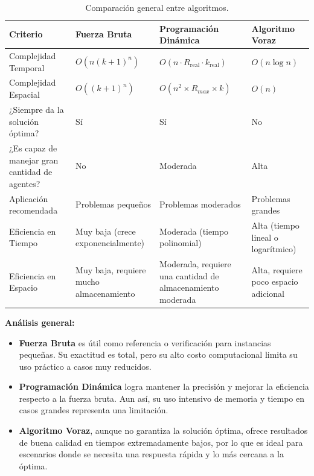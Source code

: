 \documentclass[11pt,letter]{article}
\begin{document}
\begin{table}[H]
    \centering
    \renewcommand{\arraystretch}{1.5}
    \begin{tabular}{C{4cm} C{3cm} C{3.5cm} C{3.5cm}}
        \toprule
        \textbf{Criterio}                              & \textbf{Fuerza Bruta}                   & \textbf{Programación Dinámica} & \textbf{Algoritmo Voraz}              \\
        \midrule
        Complejidad Temporal                           & \( O(n(k+1)^n) \)                       & \(O(n \cdot R_{\text{real}} \cdot k_{\text{real}})\)                 & \( O(n \log n) \)                     \\
        Complejidad Espacial                           & \( O((k+1)^n) \)                        & \( O(n^2 \times R_{max} \times k)\)                 & \( O(n) \)                            \\
        ¿Siempre da la solución óptima?                & Sí                                      & Sí                             & No                                    \\
        ¿Es capaz de manejar gran cantidad de agentes? & No                                      & Moderada                 & Alta                                  \\
        Aplicación recomendada                         & Problemas pequeños                      & Problemas moderados                      & Problemas grandes                     \\
        Eficiencia en Tiempo                           & Muy baja (crece exponencialmente)       & Moderada (tiempo polinomial)                      & Alta (tiempo lineal o logarítmico)    \\
        Eficiencia en Espacio                          & Muy baja, requiere mucho almacenamiento & Moderada, requiere una cantidad de almacenamiento moderada                      & Alta, requiere poco espacio adicional \\
        \bottomrule
    \end{tabular}
    \caption{Comparación general entre algoritmos.}
\end{table}

    \textbf{Análisis general:}
    \begin{itemize}
        \item \textbf{Fuerza Bruta} es útil como referencia o verificación para instancias pequeñas. Su exactitud es total, pero su alto costo computacional limita su uso práctico a casos muy reducidos.
        \item \textbf{Programación Dinámica} logra mantener la precisión y mejorar la eficiencia respecto a la fuerza bruta. Aun así, su uso intensivo de memoria y tiempo en casos grandes representa una limitación.
        \item \textbf{Algoritmo Voraz}, aunque no garantiza la solución óptima, ofrece resultados de buena calidad en tiempos extremadamente bajos, por lo que es ideal para escenarios donde se necesita una respuesta rápida y lo más cercana a la óptima.
    \end{itemize}
\end{document}
